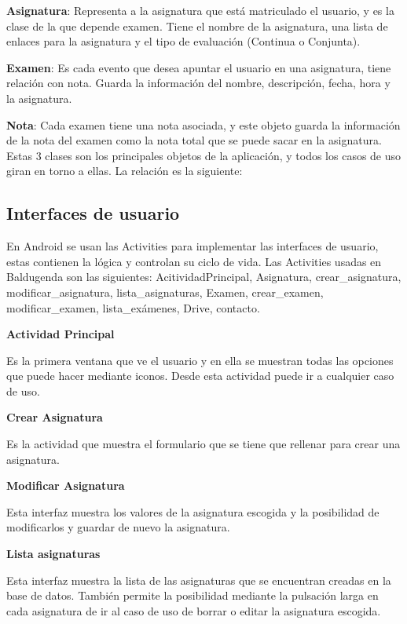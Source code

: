 \textbf{Asignatura}: Representa a la asignatura que está matriculado el usuario, y es la clase de la que depende examen. Tiene el nombre de la asignatura, una  lista de enlaces para la asignatura  y el tipo de evaluación (Continua o Conjunta).

\textbf{Examen}: Es cada evento que desea apuntar el usuario en una asignatura, tiene relación con nota. Guarda la información del nombre, descripción, fecha, hora y la asignatura.

\textbf{Nota}: Cada examen tiene una nota asociada, y este objeto guarda la información de la nota del examen como la nota total que se puede sacar en la asignatura.
Estas 3 clases son los principales objetos de la aplicación, y todos los casos de uso giran en torno a ellas.
La relación es la siguiente:



\subsection{Interfaces de usuario}
\label{subsecc:Interfaces de usuario}

En Android se usan las Activities para implementar las interfaces de usuario, estas contienen la lógica y controlan su ciclo de vida.
Las Activities usadas en Baldugenda son las siguientes: AcitividadPrincipal, Asignatura, crear\_asignatura, modificar\_asignatura, lista\_asignaturas, Examen, crear\_examen, modificar\_examen, lista\_exámenes, Drive, contacto.

\textbf{Actividad Principal}

Es la primera ventana que ve el usuario y en ella se muestran todas las opciones que puede hacer mediante iconos.
Desde esta actividad puede ir a cualquier  caso de uso.

\textbf{Crear Asignatura}

Es la actividad que muestra el formulario que se tiene que rellenar para crear una asignatura.

\textbf{Modificar Asignatura}

Esta interfaz muestra los valores de la asignatura escogida y la posibilidad de modificarlos y guardar de nuevo la asignatura.

\textbf{Lista asignaturas}

Esta interfaz muestra la lista de las asignaturas que se encuentran creadas en la base de datos.
También permite la posibilidad mediante la pulsación larga en cada asignatura de ir al caso de uso de borrar o editar la asignatura escogida.

